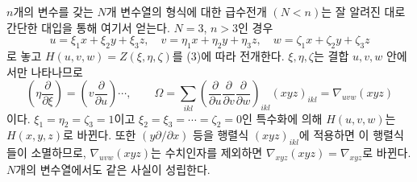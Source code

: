 
$n$개의 변수를 갖는 $N$개 변수열의 형식에 대한 급수전개 $(N<n)$는 잘 알려진 대로 간단한 대입을 통해 여기서 얻는다. $N=3$, $n>3$인 경우
\[
  u=\xi_1x+\xi_2y+\xi_3z,
  \quad v=\eta_1x+\eta_2y+\eta_3z,
  \quad w=\zeta_1x+\zeta_2y+\zeta_3z
\]
로 놓고 $H(u,v,w)=Z(\xi,\eta,\zeta)$를 (3)에 따라 전개한다. $\xi,\eta,\zeta$는 결합 $u,v,w$ 안에서만 나타나므로
\[
  \left(\eta\frac{\partial}{\partial \xi}\right)=
  \left(v\frac{\partial}{\partial u}\right)\cdots,
  \qquad
  \Omega=\sum_{ikl}\left(\frac{\partial}{\partial u}
  \frac{\partial}{\partial v}
  \frac{\partial}{\partial w}\right)_{ikl}(xyz)_{ikl}
  =\nabla_{uvw}(xyz)
\]
이다. $\xi_1=\eta_2=\zeta_3=1$이고 $\xi_2=\xi_3=\cdots=\zeta_2=0$인 특수화에 의해 $H(u,v,w)$는 $H(x,y,z)$로 바뀐다. 또한 $(y\partial/\partial x)$ 등을 행렬식 $(xyz)_{ikl}$에 적용하면 이 행렬식들이 소멸하므로, $\nabla_{uvw}(xyz)$는 수치인자를 제외하면 $\nabla_{xyz}(xyz)=\nabla_{xyz}$로 바뀐다. $N$개의 변수열에서도 같은 사실이 성립한다.
